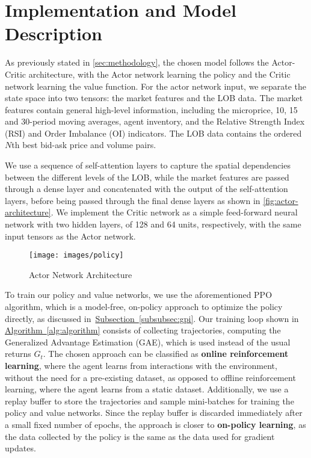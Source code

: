 \section{Implementation and Model Description}
\label{sec:implementation-and-model-description}

As previously stated in \autoref{sec:methodology}, the chosen model follows the Actor-Critic architecture,
with the Actor network learning the policy and the Critic network learning the value function.
For the actor network input, we separate the state space into two tensors: the market features and the LOB data.
The market features contain general high-level information, including the microprice, 10, 15 and 30-period moving averages,
agent inventory, and the Relative Strength Index (RSI) and Order Imbalance (OI) indicators.
The LOB data contains the ordered $N$th best bid-ask price and volume pairs.

We use a sequence of self-attention layers to capture the spatial dependencies between the different levels of the LOB,
while the market features are passed through a dense layer and concatenated with the output of the self-attention layers,
before being passed through the final dense layers as shown in \autoref{fig:actor-architecture}.
We implement the Critic network as a simple feed-forward neural network with two hidden layers, of 128 and 64 units, respectively,
with the same input tensors as the Actor network.

\begin{figure}
    \centering
    \texttt{[image: images/policy]}
    \caption{Actor Network Architecture}
    \label{fig:actor-architecture}
\end{figure}

To train our policy and value networks, we use the aforementioned PPO algorithm\cite{Schulman2017},
which is a model-free, on-policy approach to optimize the policy directly, as discussed in~\hyperref[subsubsec:gpi]{Subsection~\ref{subsubsec:gpi}}.
Our training loop shown in \hyperref[alg:algorithm]{Algorithm~\ref{alg:algorithm}} consists of collecting trajectories,
computing the Generalized Advantage Estimation (GAE), which is used instead of the usual returns $G_t$.
The chosen approach can be classified as \textbf{online reinforcement learning}, where the agent learns from interactions with the environment,
without the need for a pre-existing dataset, as opposed to offline reinforcement learning, where the agent learns from a static dataset.
Additionally, we use a replay buffer to store the trajectories and sample mini-batches for training the policy and value networks.
Since the replay buffer is discarded immediately after a small fixed number of epochs, the approach is closer to \textbf{on-policy learning},
as the data collected by the policy is the same as the data used for gradient updates.

